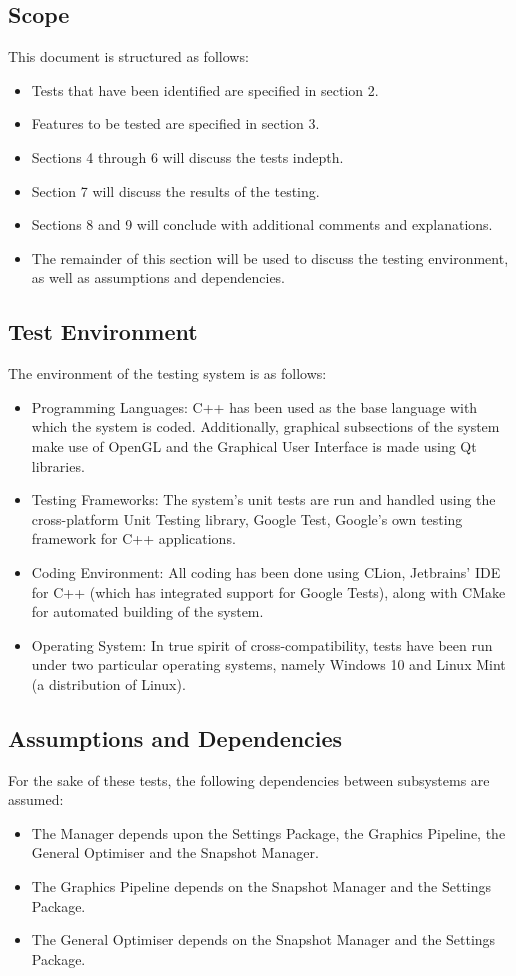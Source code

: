 \documentclass[11pt]{article}
\begin{document}
\subsection{Scope}
This document is structured as follows:
\begin{itemize}
    \item Tests that have been identified are specified in section 2.
    \item Features to be tested are specified in section 3.
    \item Sections 4 through 6 will discuss the tests indepth.
    \item Section 7 will discuss the results of the testing.
    \item Sections 8 and 9 will conclude with additional comments and explanations.
    \item The remainder of this section will be used to discuss the testing environment, as well as assumptions and dependencies.
\end{itemize}

\subsection{Test Environment}
The environment of the testing system is as follows:
\begin{itemize}
    \item Programming Languages: C++ has been used as the base language with which the system is coded. Additionally, graphical subsections of the system make use of OpenGL and the Graphical User Interface is made using Qt libraries.
    \item Testing Frameworks: The system's unit tests are run and handled using the cross-platform Unit Testing library, Google Test, Google's own testing framework for C++ applications.
    \item Coding Environment: All coding has been done using CLion, Jetbrains' IDE for C++ (which has integrated support for Google Tests), along with CMake for automated building of the system.
    \item Operating System: In true spirit of cross-compatibility, tests have been run under two particular operating systems, namely Windows 10 and Linux Mint (a distribution of Linux).
\end{itemize}

\subsection{Assumptions and Dependencies}
For the sake of these tests, the following dependencies between subsystems are assumed:
\begin{itemize}
    \item The Manager depends upon the Settings Package, the Graphics Pipeline, the General Optimiser and the Snapshot Manager.
    \item The Graphics Pipeline depends on the Snapshot Manager and the Settings Package.
    \item The General Optimiser depends on the Snapshot Manager and the Settings Package.
\end{itemize}
\end{document}
